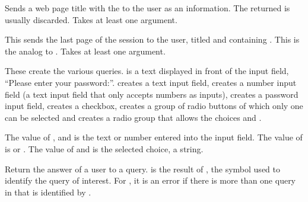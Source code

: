 \begin{desc}
  Sends a web page title  with the  to the user
  as an information.  The returned  is usually
  discarded.  Takes at least one argument.
\end{desc}

\begin{desc}
  This sends the last page of the session to the user, titled
   and containing .  This is the analog to
  .  Takes at least one argument.
\end{desc}

\begin{desc}
  These create the various queries.   is a text
  displayed in front of the input field, \eg ``Please enter your
  password:''.   creates a text input field,
   creates a number input field (\ie a text input field
  that only accepts numbers as inputs),  creates a
  password input field,  creates a checkbox,
   creates a group of radio buttons of which only one
  can be selected and  creates a radio group that
  allows the choices  and . 

  The value of ,  and 
  is the text or number entered into the input field.  The value of
   is \sharpt or \sharpf.  The value of
   and  is the selected choice, a
  string.
\end{desc}

\begin{desc}
  Return the answer of a user to a query.   is the result
  of ,  the symbol used to identify the
  query of interest.  For , it is an error if there
  is more than one query in  that is identified by
  .
\end{desc}


